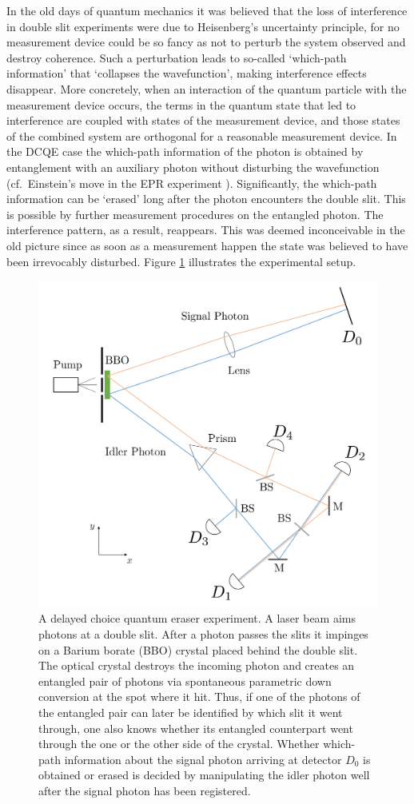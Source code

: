 \documentclass[12pt]{article}
\numberwithin{equation}{section}
\begin{document}
In the old days of quantum mechanics it was believed that the loss of interference in double slit experiments were due to Heisenberg's uncertainty principle, for no measurement device could be so fancy as not to perturb the system observed and destroy coherence. Such a perturbation leads to so-called `which-path information' that `collapses the wavefunction', making interference effects disappear. More concretely, when an interaction of the quantum particle with the measurement device occurs, the terms in the quantum state that led to interference are coupled with states of the measurement device, and those states of the combined system are orthogonal for a reasonable measurement device. In the DCQE case the which-path information of the photon is obtained by entanglement with an auxiliary photon without disturbing the wavefunction (cf.~Einstein's move in the EPR experiment \cite[p. 779]{PhysRev.47.777}). Significantly, the which-path information can be `erased' long after the photon encounters the double slit. This is possible by further measurement procedures on the entangled photon. The interference pattern, as a result, reappears.  This was deemed inconceivable in the old picture since as soon as a measurement happen the state was believed to have been irrevocably disturbed. Figure \ref{fig:Kim} illustrates the experimental setup. 
\begin{figure}[H]
\centering
\includegraphics[width=0.8\linewidth]{./DCQE.pdf}
\caption[]{A delayed choice quantum eraser experiment. A laser beam aims photons at a double slit. After a photon passes the slits it impinges on a Barium borate (BBO) crystal placed behind the double slit. The optical crystal destroys the incoming photon and creates an entangled pair of photons  via spontaneous parametric down conversion at the spot where it hit. Thus, if one of the photons of the entangled pair can later be identified by which slit it went through, one also knows whether its entangled counterpart went through the one or the other side of the crystal. Whether which-path information about the signal photon arriving at detector $D_0$ is obtained or erased is decided by manipulating the idler photon well after the signal photon has been registered.}
\label{fig:Kim}
\end{figure}
\end{document}
